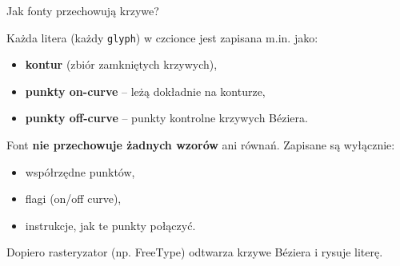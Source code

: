 \documentclass[xcolor=dvipsnames]{beamer}
\begin{document}
\begin{frame}{Jak fonty przechowują krzywe?}
	
	Każda litera (każdy \texttt{glyph}) w czcionce jest zapisana m.in. jako:
	
	\pause
	\begin{itemize}
		\item \textbf{kontur} (zbiór zamkniętych krzywych), 
		\pause \item \textbf{punkty on-curve} -- leżą dokładnie na konturze, 
		\pause \item \textbf{punkty off-curve} -- punkty kontrolne krzywych Béziera. 
	\end{itemize}
	
	\pause
	Font \textbf{nie przechowuje żadnych wzorów} ani równań.  
	Zapisane są wyłącznie:
	\begin{itemize}
		\item współrzędne punktów,
		\item flagi (on/off curve),
		\item instrukcje, jak te punkty połączyć.
	\end{itemize}
	
	\pause
	Dopiero rasteryzator (np. FreeType) odtwarza krzywe Béziera i rysuje literę.
\end{frame}

%	
%	
\end{document}
